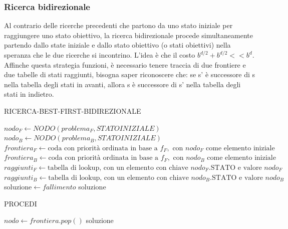 \documentclass{article}
\begin{document}
\subsubsection{Ricerca bidirezionale}
Al contrario delle ricerche precedenti che partono da uno stato iniziale per raggiungere uno stato obiettivo, la ricerca bidirezionale procede simultaneamente partendo dallo state iniziale e dallo stato obiettivo (o stati obiettivi) nella speranza che le due ricerche si incontrino. L'idea è che il costo $b^{d/2}+b^{d/2}<<b^d$. Affinche questa strategia funzioni, è necessario tenere traccia di due frontiere e due tabelle di stati raggiunti, bisogna saper riconoscere che: se s' è successore di s nella tabella degli stati in avanti, allora s è successore di s' nella tabella degli stati in indietro. 
\begin{center}
\begin{algorithm}
\caption{RICERCA-BEST-FIRST-BIDIREZIONALE}
$nodo_F\leftarrow NODO(problema_F,STATOINIZIALE)$\;
$nodo_B\leftarrow NODO(problema_B,STATOINIZIALE)$\;
$frontiera_F\leftarrow \text{coda con priorità ordinata in base a }f_F,\text{ con }nodo_F \text{ come elemento iniziale}$\;
$frontiera_B\leftarrow \text{coda con priorità ordinata in base a }f_F,\text{ con }nodo_B \text{ come elemento iniziale}$\;
$raggiunti_F\leftarrow \text{tabella di lookup, con un elemento con chiave }nodo_F.\text{STATO e valore }nodo_F$\;
$raggiunti_B\leftarrow \text{tabella di lookup, con un elemento con chiave }nodo_B.\text{STATO e valore }nodo_B$\;
soluzione$\leftarrow fallimento$\;
\Return soluzione\;
\end{algorithm}
\end{center}
\begin{center}
\begin{algorithm}
\caption{PROCEDI}
$nodo\leftarrow frontiera.pop()$\;
\Return soluzione\;
\end{algorithm}
\end{center}
\end{document}
